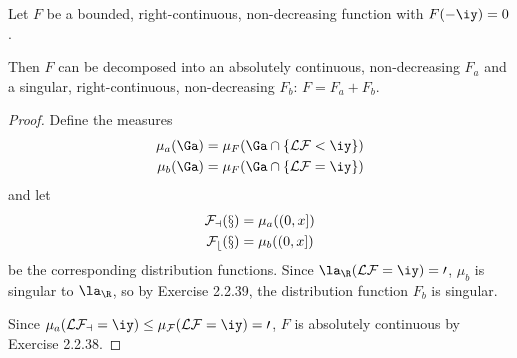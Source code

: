 \begin{thm}\label{spns}
Let $F$ be a bounded, right-continuous, non-decreasing function with $F(-\iy)=0$.

Then $F$ can be decomposed into an absolutely continuous, non-decreasing $F_a$ and a singular, right-continuous, non-decreasing $F_b$:   %
$F=F_{a}+F_{b}$. 
\end{thm}
\begin{proof}
Define the measures
\begin{align*}
\mu_a(\Ga)&=\mu_F(\Ga\cap \{\cal L F<\iy\})\\
\mu_b(\Ga)&=\mu_F(\Ga\cap \{\cal L F=\iy\})
\end{align*}
and let
\begin{align*}
\cal F_a(x)&=\mu_a((0,x])\\
\cal F_b(x)&=\mu_b((0,x])
\end{align*}
be the corresponding distribution functions.
Since $\la_{\R}(\cal L F=\iy)=0$, $\mu_b$ is singular to $\la_{\R}$, so by Exercise 2.2.39, the distribution function $F_b$ is singular.

Since $\mu_a(\cal LF_a=\iy)\le \mu_F(\cal LF=\iy)=0$, $F$ is absolutely continuous by Exercise 2.2.38.
%
\end{proof}

